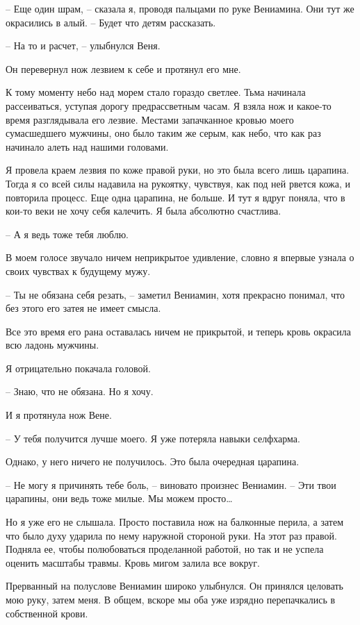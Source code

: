 \documentclass[
]{book}
\begin{document}
-- Еще один шрам, -- сказала я, проводя пальцами по руке Вениамина. Они тут же окрасились в алый. -- Будет что детям рассказать.

-- На то и расчет, -- улыбнулся Веня.

Он перевернул нож лезвием к себе и протянул его мне.

К тому моменту небо над морем стало гораздо светлее. Тьма начинала рассеиваться, уступая дорогу предрассветным часам. Я взяла нож и какое-то время разглядывала его лезвие. Местами запачканное кровью моего сумасшедшего мужчины, оно было таким же серым, как небо, что как раз начинало алеть над нашими головами.

Я провела краем лезвия по коже правой руки, но это была всего лишь царапина. Тогда я со всей силы надавила на рукоятку, чувствуя, как под ней рвется кожа, и повторила процесс. Еще одна царапина, не больше. И тут я вдруг поняла, что в кои-то веки не хочу себя калечить. Я была абсолютно счастлива.

-- А я ведь тоже тебя люблю.

В моем голосе звучало ничем неприкрытое удивление, словно я впервые узнала о своих чувствах к будущему мужу.

-- Ты не обязана себя резать, -- заметил Вениамин, хотя прекрасно понимал, что без этого его затея не имеет смысла.

Все это время его рана оставалась ничем не прикрытой, и теперь кровь окрасила всю ладонь мужчины.

Я отрицательно покачала головой.

-- Знаю, что не обязана. Но я хочу.

И я протянула нож Вене.

-- У тебя получится лучше моего. Я уже потеряла навыки селфхарма.

Однако, у него ничего не получилось. Это была очередная царапина.

-- Не могу я причинять тебе боль, -- виновато произнес Вениамин. -- Эти твои царапины, они ведь тоже милые. Мы можем просто\ldots{}

Но я уже его не слышала. Просто поставила нож на балконные перила, а затем что было духу ударила по нему наружной стороной руки. На этот раз правой. Подняла ее, чтобы полюбоваться проделанной работой, но так и не успела оценить масштабы травмы. Кровь мигом залила все вокруг.

Прерванный на полуслове Вениамин широко улыбнулся. Он принялся целовать мою руку, затем меня. В общем, вскоре мы оба уже изрядно перепачкались в собственной крови.
\end{document}
